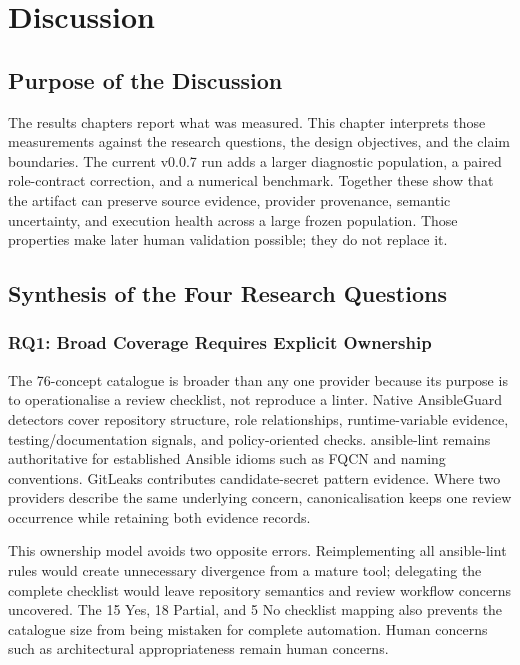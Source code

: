 \chapter{Discussion}
\label{chap:discussion}

\section{Purpose of the Discussion}
The results chapters report what was measured. This chapter interprets those
measurements against the research questions, the design objectives, and the
claim boundaries. The current v0.0.7 run adds a larger diagnostic population,
a paired role-contract correction, and a numerical benchmark. Together these
show that the artifact can preserve source evidence,
provider provenance, semantic uncertainty, and execution health across a
large frozen population. Those properties make later human validation
possible; they do not replace it.

\section{Synthesis of the Four Research Questions}
\subsection{RQ1: Broad Coverage Requires Explicit Ownership}
The 76-concept catalogue is broader than any one provider because its purpose
is to operationalise a review checklist, not reproduce a linter. Native
AnsibleGuard detectors cover repository structure, role relationships,
runtime-variable evidence, testing/documentation signals, and policy-oriented
checks. ansible-lint remains authoritative for established Ansible idioms such
as FQCN and naming conventions. GitLeaks contributes candidate-secret pattern
evidence. Where two providers describe the same underlying concern,
canonicalisation keeps one review occurrence while retaining both evidence
records.

This ownership model avoids two opposite errors. Reimplementing all
ansible-lint rules would create unnecessary divergence from a mature tool;
delegating the complete checklist would leave repository semantics and review
workflow concerns uncovered. The 15 Yes, 18 Partial, and 5 No checklist mapping
also prevents the catalogue size from being mistaken for complete automation.
Human concerns such as architectural appropriateness remain human concerns.

